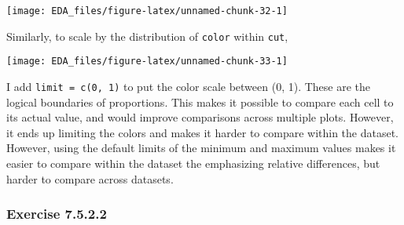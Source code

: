\documentclass[]{book}
\newenvironment{Shaded}{\begin{snugshade}}{\end{snugshade}}
\newcommand{\DataTypeTok}[1]{\textcolor[rgb]{0.13,0.29,0.53}{#1}}
\newcommand{\DecValTok}[1]{\textcolor[rgb]{0.00,0.00,0.81}{#1}}
\newcommand{\KeywordTok}[1]{\textcolor[rgb]{0.13,0.29,0.53}{\textbf{#1}}}
\newcommand{\NormalTok}[1]{#1}
\newcommand{\OperatorTok}[1]{\textcolor[rgb]{0.81,0.36,0.00}{\textbf{#1}}}
\newcommand{\StringTok}[1]{\textcolor[rgb]{0.31,0.60,0.02}{#1}}
\theoremstyle{plain}
\theoremstyle{remark}
\begin{document}
\begin{center}\texttt{[image: EDA\_files/figure-latex/unnamed-chunk-32-1]} \end{center}

Similarly, to scale by the distribution of \texttt{color} within
\texttt{cut},

\begin{Shaded}
\end{Shaded}

\begin{center}\texttt{[image: EDA\_files/figure-latex/unnamed-chunk-33-1]} \end{center}

I add \texttt{limit\ =\ c(0,\ 1)} to put the color scale between (0, 1).
These are the logical boundaries of proportions. This makes it possible
to compare each cell to its actual value, and would improve comparisons
across multiple plots. However, it ends up limiting the colors and makes
it harder to compare within the dataset. However, using the default
limits of the minimum and maximum values makes it easier to compare
within the dataset the emphasizing relative differences, but harder to
compare across datasets.

\hypertarget{exercise-7.5.2.2}{%
\subsubsection*{\texorpdfstring{Exercise
{7.5.2.2}}{Exercise 7.5.2.2}}\label{exercise-7.5.2.2}}
\end{document}
